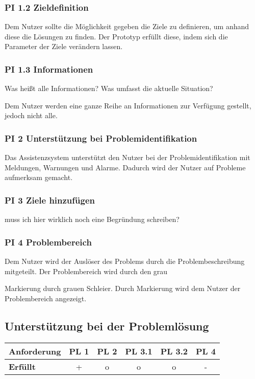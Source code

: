 \subsubsection*{PI 1.2 Zieldefinition}
Dem Nutzer sollte die Möglichkeit gegeben die Ziele zu definieren, um anhand diese die Lösungen zu finden. Der Prototyp erfüllt diese, indem sich die Parameter der Ziele verändern lassen.

\subsubsection*{PI 1.3 Informationen}
Was heißt alle Informationen? Was umfasst die aktuelle Situation?

Dem Nutzer werden eine ganze Reihe an Informationen zur Verfügung gestellt, jedoch nicht alle.

\subsubsection*{PI 2 Unterstützung bei Problemidentifikation}
Das Assistenzsystem unterstützt den Nutzer bei der Problemidentifikation mit Meldungen, Warnungen und Alarme. Dadurch wird der Nutzer auf Probleme aufmerksam gemacht.

\subsubsection*{PI 3 Ziele hinzufügen}
muss ich hier wirklich noch eine Begründung schreiben?

\subsubsection*{PI 4 Problembereich}
Dem Nutzer wird der Auslöser des Problems durch die Problembeschreibung mitgeteilt. Der Problembereich wird durch den grau 

Markierung durch grauen Schleier.
Durch Markierung wird dem Nutzer der Problembereich angezeigt.

\subsection{Unterstützung bei der Problemlösung}
\begin{table}[htbp]
\centering
\begin{tabular}{l|c|c|c|c|c}
\textbf{Anforderung} & PL 1 & PL 2 & PL 3.1 & PL 3.2 & PL 4 \\
\hline
\textbf{Erfüllt} & + & o & o & o & - \\
\end{tabular}
\end{table}

